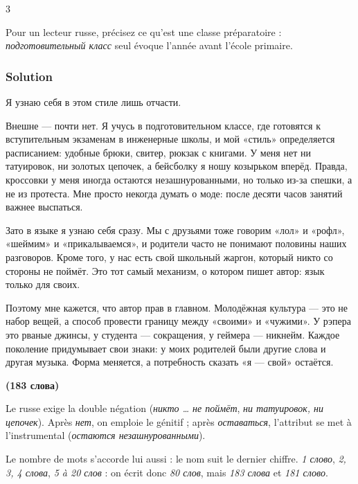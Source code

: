 \documentclass[11pt,a4paper]{article}
\begin{document}
\begin{indication}{3}

Pour un lecteur russe, précisez ce qu'est une classe préparatoire : \emph{подготовительный класс} seul évoque l'année avant l'école primaire.

\end{indication}

\hypertarget{solution-16}{%
\subsubsection{Solution}\label{solution-16}}

Я узнаю себя в этом стиле лишь отчасти.

Внешне --- почти нет. Я учусь в подготовительном классе, где готовятся к вступительным экзаменам в инженерные школы, и мой «стиль» определяется расписанием: удобные брюки, свитер, рюкзак с книгами. У меня нет ни татуировок, ни золотых цепочек, а бейсболку я ношу козырьком вперёд. Правда, кроссовки у меня иногда остаются незашнурованными, но только из-за спешки, а не из протеста. Мне просто некогда думать о моде: после десяти часов занятий важнее выспаться.

Зато в языке я узнаю себя сразу. Мы с друзьями тоже говорим «лол» и «рофл», «шеймим» и «прикалываемся», и родители часто не понимают половины наших разговоров. Кроме того, у нас есть свой школьный жаргон, который никто со стороны не поймёт. Это тот самый механизм, о котором пишет автор: язык только для своих.

Поэтому мне кажется, что автор прав в главном. Молодёжная культура --- это не набор вещей, а способ провести границу между «своими» и «чужими». У рэпера это рваные джинсы, у студента --- сокращения, у геймера --- никнейм. Каждое поколение придумывает свои знаки: у моих родителей были другие слова и другая музыка. Форма меняется, а потребность сказать «я --- свой» остаётся.

\textbf{(183 слова)}

\begin{methode}

Le russe exige la double négation (\emph{никто \ldots{} не поймёт}, \emph{ни татуировок, ни цепочек}). Après \emph{нет}, on emploie le génitif ; après \emph{оставаться}, l'attribut se met à l'instrumental (\emph{остаются незашнурованными}).

\end{methode}

\begin{piege}

Le nombre de mots s'accorde lui aussi : le nom suit le dernier chiffre. \emph{1 слово}, \emph{2, 3, 4 слова}, \emph{5 à 20 слов} : on écrit donc \emph{80 слов}, mais \emph{183 слова} et \emph{181 слово}.

\end{piege}
\end{document}
